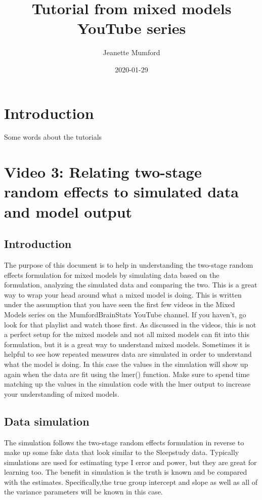 \documentclass[]{book}
\title{Tutorial from mixed models YouTube series}
\author{Jeanette Mumford}
\date{2020-01-29}
\begin{document}
\maketitle

{
\setcounter{tocdepth}{1}
\tableofcontents
}
\chapter{Introduction}\label{introduction}

Some words about the tutorials

\chapter{Video 3: Relating two-stage random effects to simulated data
and model
output}\label{video-3-relating-two-stage-random-effects-to-simulated-data-and-model-output}

\section{Introduction}\label{introduction-1}

The purpose of this document is to help in understanding the two-stage
random effects formulation for mixed models by simulating data based on
the formulation, analyzing the simulated data and comparing the two.
This is a great way to wrap your head around what a mixed model is
doing. This is written under the assumption that you have seen the first
few videos in the Mixed Models series on the MumfordBrainStats YouTube
channel. If you haven't, go look for that playlist and watch those
first. As discussed in the videos, this is not a perfect setup for the
mixed models and not all mixed models can fit into this formulation, but
it is a great way to understand mixed models. Sometimes it is helpful to
see how repeated measures data are simulated in order to understand what
the model is doing. In this case the values in the simulation will show
up again when the data are fit using the lmer() function. Make sure to
spend time matching up the values in the simulation code with the lmer
output to increase your understanding of mixed models.

\section{Data simulation}\label{data-simulation}

The simulation follows the two-stage random effects formulation in
reverse to make up some fake data that look similar to the Sleepstudy
data. Typically simulations are used for estimating type I error and
power, but they are great for learning too. The benefit in simulation is
the truth is known and be compared with the estimates. Specifically,the
true group intercept and slope as well as all of the variance parameters
will be known in this case.
\end{document}
